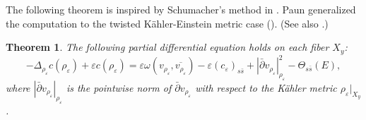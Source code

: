 \documentclass{amsart}
\newtheorem{theorem}{Theorem}[section]
\theoremstyle{definition}
\numberwithin{equation}{section}
\begin{document}
The following theorem is inspired by Schumacher's method in \cite{Schumacher}. Paun generalized the computation to the twisted K\"ahler-Einstein metric case (\cite{Paun2}). (See also \cite{Choi1}.)

\begin{theorem}\label{T:PDE}
The following partial differential equation holds on each fiber $X_y$:
\begin{equation*}
-\Delta_{\rho_{\varepsilon}} c(\rho_\varepsilon)
+\varepsilon c(\rho_\varepsilon)
= 
\varepsilon\omega(v_{\rho_{\varepsilon}},\overline{v_{\rho_{\varepsilon}}})
-
\varepsilon(c_\varepsilon)_{s\bar s}
+{\left\vert{\bar\partial v_{\rho_{\varepsilon}}}\right\vert}_{\rho_{\varepsilon}}^2
-\Theta_{s\bar s}(E),
\end{equation*}
where ${\left\vert{\bar\partial v_{\rho_{\varepsilon}}}\right\vert}_{\rho_{\varepsilon}}$ is the pointwise norm of $\bar\partial v_{\rho_{\varepsilon}}$ with respect to the K\"ahler metric $\rho_{\varepsilon}\vert_{X_y}$.
\end{theorem}
\end{document}
